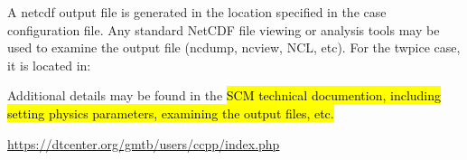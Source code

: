 A netcdf output file is generated in the location specified in the case
configuration file. Any standard NetCDF file viewing or analysis tools may be used to 
examine the output file (ncdump, ncview, NCL, etc).  For the twpice case, it is located in:


Additional details may be found in the \hl{SCM technical documention, including setting physics parameters, examining the output files, etc.  }

\url{https://dtcenter.org/gmtb/users/ccpp/index.php}







